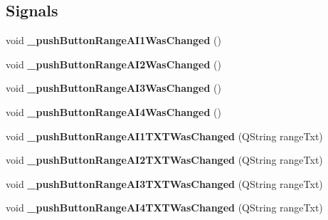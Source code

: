 \subsection*{Signals}
\begin{DoxyCompactItemize}
\item 
\mbox{\label{class_setting_trigger_setting_ac357536ab651b11363330684500f8549}} 
void {\bfseries \+\_\+push\+Button\+Range\+A\+I1\+Was\+Changed} ()
\item 
\mbox{\label{class_setting_trigger_setting_a50184460b738f2df9a4808943c63a22a}} 
void {\bfseries \+\_\+push\+Button\+Range\+A\+I2\+Was\+Changed} ()
\item 
\mbox{\label{class_setting_trigger_setting_a1c94ea1258ec25c7d04a09e628ac30f4}} 
void {\bfseries \+\_\+push\+Button\+Range\+A\+I3\+Was\+Changed} ()
\item 
\mbox{\label{class_setting_trigger_setting_aaebea6af1ed1ee48fcfa24927104357b}} 
void {\bfseries \+\_\+push\+Button\+Range\+A\+I4\+Was\+Changed} ()
\item 
\mbox{\label{class_setting_trigger_setting_ae418f75c26f7d2fd8eb669beb363797b}} 
void {\bfseries \+\_\+push\+Button\+Range\+A\+I1\+T\+X\+T\+Was\+Changed} (Q\+String range\+Txt)
\item 
\mbox{\label{class_setting_trigger_setting_ab6cb5264eb0b9b62b564497bf009f5ef}} 
void {\bfseries \+\_\+push\+Button\+Range\+A\+I2\+T\+X\+T\+Was\+Changed} (Q\+String range\+Txt)
\item 
\mbox{\label{class_setting_trigger_setting_ab343e62cee3bcdeb29175d714ac59aa8}} 
void {\bfseries \+\_\+push\+Button\+Range\+A\+I3\+T\+X\+T\+Was\+Changed} (Q\+String range\+Txt)
\item 
\mbox{\label{class_setting_trigger_setting_aa994764b4901d6f9e536009d2d820ee2}} 
void {\bfseries \+\_\+push\+Button\+Range\+A\+I4\+T\+X\+T\+Was\+Changed} (Q\+String range\+Txt)
\item 
\mbox{\label{class_setting_trigger_setting_ab28b5eb7108901daa9eedafd3e8c529e}} 

\end{DoxyCompactItemize}
